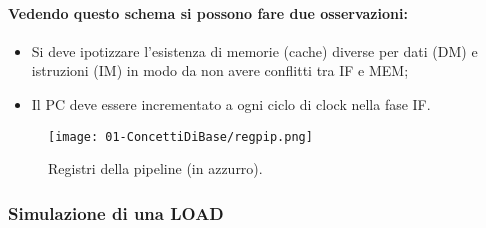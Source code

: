 \paragraph{Vedendo questo schema si possono fare due osservazioni:}

\begin{itemize}
  \item Si deve ipotizzare l'esistenza di memorie (cache) diverse per dati (DM) e istruzioni (IM) in modo da non avere conflitti tra IF e MEM;
  \item Il PC deve essere incrementato a ogni ciclo di clock nella fase IF.
\end{itemize}



\begin{figure}[h]
    \centering
    \texttt{[image: 01-ConcettiDiBase/regpip.png]}
    \caption{Registri della pipeline (in azzurro).}
\end{figure}

\subsubsection{Simulazione di una LOAD}

